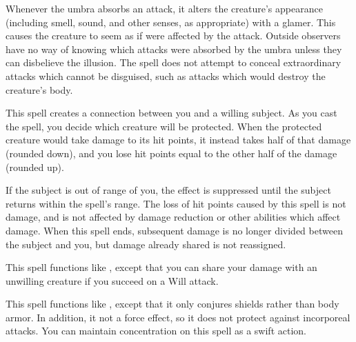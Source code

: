 Whenever the umbra absorbs an attack, it alters the creature's appearance (including smell, sound, and other senses, as appropriate) with a glamer. This causes the creature to seem as if were affected by the attack. Outside observers have no way of knowing which attacks were absorbed by the umbra unless they can disbelieve the illusion. The spell does not attempt to conceal extraordinary attacks which cannot be disguised, such as attacks which would destroy the creature's body.

\spelldur{\durlong \dismissable}
\spelleffect This spell creates a connection between you and a willing subject. As you cast the spell, you decide which creature will be protected. When the protected creature would take damage to its hit points, it instead takes half of that damage (rounded down), and you lose hit points equal to the other half of the damage (rounded up).

If the subject is out of range of you, the effect is suppressed until the subject returns within the spell's range.
\spellnotes The loss of hit points caused by this spell is not damage, and is not affected by damage reduction or other abilities which affect damage. When this spell ends, subsequent damage is no longer divided between the subject and you, but damage already shared is not reassigned.

\spelleffect This spell functions like , except that you can share your damage with an unwilling creature if you succeed on a Will attack.

\spelleffect This spell functions like , except that it only conjures shields rather than body armor. In addition, it not a force effect, so it does not protect against incorporeal attacks.
\spelleffect You can maintain concentration on this spell as a swift action.

